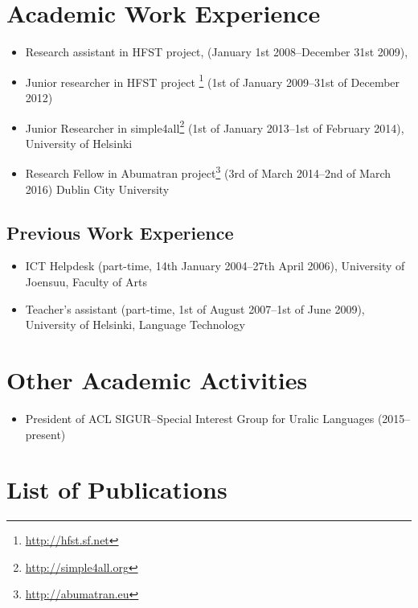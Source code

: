 \documentclass[a4paper]{article}
\begin{document}
\section{Academic Work Experience}

\begin{itemize}
\item Research assistant in HFST project, (January 1st 2008–December 31st 2009),
\item Junior researcher in HFST project \footnote{\url{http://hfst.sf.net}} (1st of January 2009–31st of December 2012)
\item Junior Researcher in simple4all\footnote{\url{http://simple4all.org}} (1st of January 2013–1st of February 2014), University of Helsinki
\item Research Fellow in Abumatran project\footnote{\url{http://abumatran.eu}} (3rd of March 2014–2nd of March 2016) Dublin City University
\end{itemize}

\subsection{Previous Work Experience}

\begin{itemize}
    \item ICT Helpdesk (part-time, 14th January 2004–27th April 2006), University of Joensuu, Faculty of Arts
    \item Teacher's assistant (part-time, 1st of August 2007–1st of June 2009), University of Helsinki, Language Technology
\end{itemize}

\section{Other Academic Activities}

\begin{itemize}
\item President of ACL SIGUR–Special Interest Group for Uralic Languages (2015–present)
\end{itemize}

\section{List of Publications}
\end{document}
